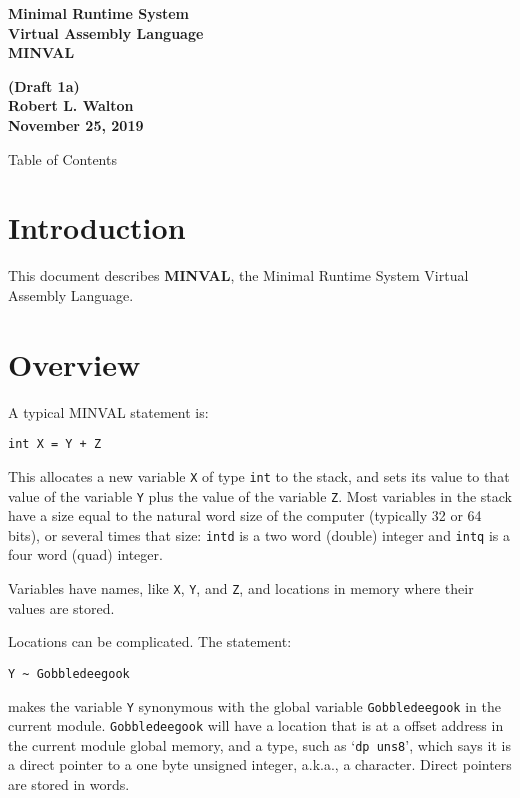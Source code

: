 \documentclass[12pt]{article}
\makeatletter
\renewcommand\tableofcontents{%
    \begin{list}{}%
	     {\setlength{\itemsep}{0in}%
	      \setlength{\topsep}{0in}%
	      \setlength{\parsep}{1ex}%
	      \setlength{\labelwidth}{0in}%
	      \setlength{\baselineskip}{1.5ex}%
	      \setlength{\leftmargin}{0.8in}%
	      \setlength{\rightmargin}{0.8in}}%
    \item\@starttoc{toc}%
    \end{list}}
\newcommand{\TILDE}{\textasciitilde}
\newcommand{\key}[1]{{\rm \bfseries #1}}
\makeatother
\begin{document}
        
\begin{center}
\Large \bf
Minimal Runtime System\\
Virtual Assembly Language\\[0.5ex]
\huge \bf
MINVAL
\end{center}
\begin{center}
\large \bf
(Draft 1a)
\\[0.5ex]
Robert L. Walton\\
November 25, 2019

\bigskip
 
Table of Contents
\end{center}

\bigskip

\tableofcontents 

\newpage

\section{Introduction}

This document describes \key{MINVAL}, the Minimal Runtime System Virtual
Assembly Language.

\section{Overview}

A typical MINVAL statement is:
\begin{center}
\tt int X = Y + Z
\end{center}
This allocates a new variable {\tt X} of type {\tt int}
to the stack, and sets its value to that value of the
variable {\tt Y} plus the value of the variable {\tt Z}.
Most variables in the stack have a size equal to the natural
word size of the computer (typically 32 or 64 bits), or
several times that size: {\tt intd} is a two word (double) integer
and {\tt intq} is a four word (quad) integer.

Variables have names, like {\tt X}, {\tt Y}, and {\tt Z},
and locations in memory where their values are stored.

Locations can be complicated.  The statement:
\begin{center}
\tt Y \TILDE{} Gobbledeegook
\end{center}
makes the variable {\tt Y} synonymous with the
global variable {\tt Gobbledeegook} in the current
module.  {\tt Gobbledeegook} will have a location that
is at a offset address in the current module global memory, and
a type, such as `{\tt dp uns8}', which says it is a
direct pointer to a one byte unsigned integer, a.k.a., a character.
Direct pointers are stored in words.
\end{document}
